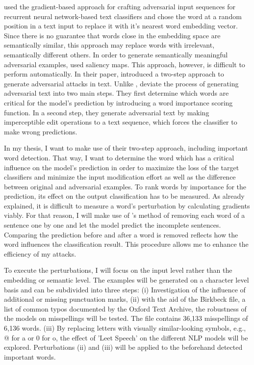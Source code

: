 \cite{papernot2016crafting} used the gradient-based approach for crafting adversarial input sequences for recurrent neural network-based text classifiers and chose the word at a random position in a text input to replace it with it's nearest word embedding vector. Since there is no guarantee that words close in the embedding space are semantically similar, this approach may replace words with irrelevant, semantically different others. 
In order to generate semantically meaningful adversarial examples, \cite{samanta2017towards} used saliency maps. This approach, however, is difficult to perform automatically. In their paper, \cite{gao2018black} introduced a two-step approach to generate adversarial attacks in text. Unlike \cite{papernot2016crafting}, \cite{gao2018black} deviate the process of generating adversarial text into two main steps. They first determine which words are critical for the model's prediction by introducing a word importance scoring function. In a second step, they generate adversarial text by making imperceptible edit operations to a text sequence, which forces the classifier to make wrong predictions.

In my thesis, I want to make use of their two-step approach, including important word detection. That way, I want to determine the word which has a critical influence on the model's prediction in order to maximize the loss of the target classifiers and minimize the input modification effort as well as the difference between original and adversarial examples. 
To rank words by importance for the prediction, its effect on the output classification has to be measured. As already explained, it is difficult to measure a word's perturbation by calculating gradients viably. 
For that reason, I will make use of \cite{jin2019bert}'s method of removing each word of a sentence one by one and let the model predict the incomplete sentences. 
 Comparing the prediction before and after a word is removed reflects how the word influences the classification result. This procedure allows me to enhance the efficiency of my attacks.

To execute the perturbations, I will focus on the input level rather than the embedding or semantic level. The examples will be generated on a character level basis and can be subdivided into three steps:
(i) Investigation of the influence of additional or missing punctuation marks,
(ii) with the aid of the Birkbeck file, a list of common typos documented by the Oxford Text Archive, the robustness of the models on misspellings will be tested. The file contains 36,133 misspellings of 6,136 words.
(iii) By replacing letters with visually similar-looking symbols, e.g., @ for a or 0 for o, the effect of 'Leet Speech' on the different NLP models will be explored.
Perturbations (ii) and (iii) will be applied to the beforehand detected important words.

